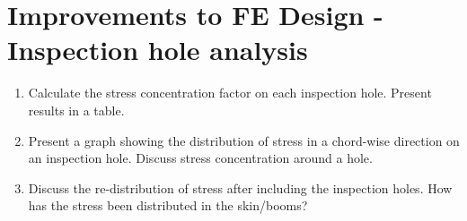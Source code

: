 \documentclass[11pt,a4paper,oneside]{memoir}
\begin{document}
\section{Improvements to FE Design - Inspection hole analysis}
\begin{enumerate}
	\item Calculate the stress concentration factor on each inspection hole. Present results in a table.
	\item Present a graph showing the distribution of stress in a chord-wise direction on an inspection hole. Discuss stress concentration around a hole.
	\item Discuss the re-distribution of stress after including the inspection holes. How has the stress been distributed in the skin/booms?
\end{enumerate}
\end{document}
